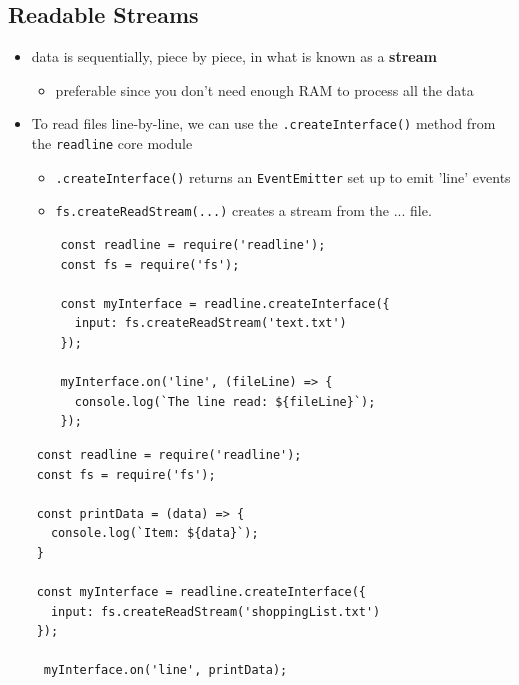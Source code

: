 \documentclass[12pt]{article}
\begin{document}
\subsection{Readable Streams}
\begin{itemize}
    \item data is sequentially, piece by piece, in what is known as a \textbf{stream}
    \begin{itemize}
        \item preferable since you don’t need enough RAM to process all the data
    \end{itemize}
    \item To read files line-by-line, we can use the \texttt{.createInterface()} method from the \texttt{readline} core module
    \begin{itemize}
        \item \texttt{.createInterface()} returns an \texttt{EventEmitter} set up to emit 'line' events
        \item \texttt{fs.createReadStream(...)} creates a stream from the ... file.
    \end{itemize}

\begin{lstlisting}
    const readline = require('readline');
    const fs = require('fs');

    const myInterface = readline.createInterface({
      input: fs.createReadStream('text.txt')
    });

    myInterface.on('line', (fileLine) => {
      console.log(`The line read: ${fileLine}`);
    });
\end{lstlisting}

\end{itemize}

\begin{lstlisting}
    const readline = require('readline');
    const fs = require('fs');

    const printData = (data) => {
      console.log(`Item: ${data}`);
    }

    const myInterface = readline.createInterface({
      input: fs.createReadStream('shoppingList.txt')
    });

     myInterface.on('line', printData);
\end{lstlisting}
\end{document}
